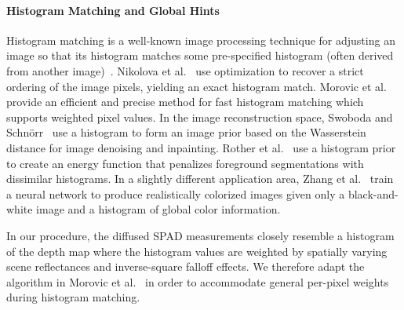 \paragraph{Histogram Matching and Global Hints}
%
Histogram matching is a well-known image processing technique for adjusting an
image so that its histogram matches some pre-specified histogram (often derived
from another image)~\cite{gonzales1977gray,Gonzalez2008}. Nikolova et
al.~\cite{Nikolova2013} use optimization to recover a strict ordering of the
image pixels, yielding an exact histogram match. Morovic et
al.~\cite{Morovic2002} provide an efficient and precise method for fast
histogram matching which supports weighted pixel values. In the image
reconstruction space, Swoboda and Schn\"orr~\cite{Swoboda2013} use a histogram
to form an image prior based on the Wasserstein distance for image denoising and
inpainting. Rother et al.~\cite{Rother2006} use a histogram prior to create an
energy function that penalizes foreground segmentations with dissimilar
histograms. In a slightly different application area, Zhang et
al.~\cite{Zhang2017} train a neural network to produce realistically colorized
images given only a black-and-white image and a histogram of global color
information.


In our procedure, the diffused SPAD measurements closely resemble a histogram of
the depth map where the histogram values are weighted by spatially varying scene
reflectances and inverse-square falloff effects. We therefore adapt the
algorithm in Morovic et al.~\cite{Morovic2002} in order to accommodate general
per-pixel weights during histogram matching.


%


